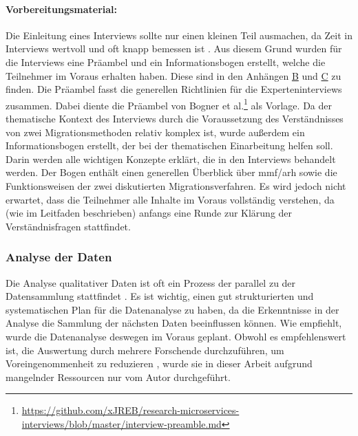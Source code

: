 \paragraph{Vorbereitungsmaterial:}
Die Einleitung eines Interviews sollte nur einen kleinen Teil ausmachen, da Zeit in Interviews wertvoll und oft knapp bemessen ist \cite{Runeson2009,hove-anda-2005,seaman2008qualitative}.
Aus diesem Grund wurden für die Interviews eine Präambel und ein Informationsbogen erstellt, welche die Teilnehmer im Voraus erhalten haben.
Diese sind in den Anhängen \hyperref[chap:expert-interviews-preamble]{B} und \hyperref[chap:expert-interviews-infobogen]{C} zu finden.
Die Prä\-am\-bel fasst die generellen Richtlinien für die Experteninterviews zusammen.
Dabei diente die Präambel von Bogner et al.\footnote{\url{https://github.com/xJREB/research-microservices-interviews/blob/master/interview-preamble.md}} als Vorlage.
Da der thematische Kontext des Interviews durch die Voraussetzung des Verständnisses von zwei Migrationsmethoden relativ komplex ist, wurde außerdem ein Informationsbogen erstellt, der bei der thematischen Einarbeitung helfen soll.
Darin werden alle wichtigen Konzepte erklärt, die in den Interviews behandelt werden.
Der Bogen enthält einen generellen Überblick über  \gls{mmf}/\gls{arh} sowie die Funktionsweisen der zwei diskutierten Migrationsverfahren.
Es wird jedoch nicht erwartet, dass die Teilnehmer alle Inhalte im Voraus vollständig verstehen, da (wie im Leitfaden beschrieben) anfangs eine Runde zur Klärung der Verständnisfragen stattfindet.

\subsubsection{Analyse der Daten}

Die Analyse qualitativer Daten ist oft ein Prozess der parallel zu der Datensammlung stattfindet \cite{Runeson2009}.
Es ist wichtig, einen gut strukturierten und systematischen Plan für die Datenanalyse zu haben, da die Erkenntnisse in der Analyse die Sammlung der nächsten Daten beeinflussen können.
Wie  empfiehlt, wurde die Datenanalyse deswegen im Voraus geplant.
Obwohl es empfehlenswert ist, die Auswertung durch mehrere Forschende durchzuführen, um Voreingenommenheit zu reduzieren \cite{Runeson2009}, wurde sie in dieser Arbeit aufgrund mangelnder Ressourcen nur vom Autor durchgeführt.

